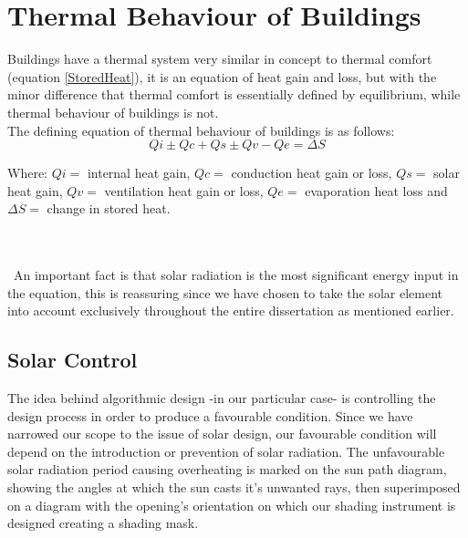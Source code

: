 \documentclass[a4paper,twoside,12pt,openright,final,oldfontcommands]{memoir}
\begin{document}
\section{Thermal Behaviour of Buildings}
Buildings have a thermal system very similar in concept to thermal comfort
(equation \ref{StoredHeat}), it is an equation of heat gain and loss, but with the minor
difference that thermal comfort is essentially defined by equilibrium, while thermal behaviour of buildings is
not.\\ The defining equation of thermal behaviour of buildings is as follows:
\begin{equation}
Qi \pm Qc + Qs \pm Qv - Qe = \Delta S
\end{equation}

\begin{minipage}{\dimexpr\textwidth-3cm}
{\footnotesize Where: $Qi=$ internal heat gain, $Qc=$ conduction heat gain or loss, $Qs=$ 
solar heat gain, $Qv=$ ventilation heat gain or loss, $Qe=$ evaporation heat loss and $\Delta S=$
change in stored heat.} \end{minipage}\\\\\
An important fact is that solar radiation is the most significant energy input in the
equation\cite{szokolay08}, this is reassuring since we have chosen to take the solar element into
account exclusively throughout the entire dissertation as mentioned earlier.

\subsection{Solar Control}
The idea behind algorithmic design -in our particular case- is controlling the design process
in order to produce a favourable condition. Since we have narrowed our scope to the issue of solar
design, our favourable condition will depend on the introduction or prevention of solar radiation.
The unfavourable solar radiation period causing overheating is marked on the sun path diagram, showing
the angles at which the sun casts it's unwanted rays, then superimposed on a diagram with the
opening's orientation on which our shading instrument is designed creating a shading mask.
\end{document}
